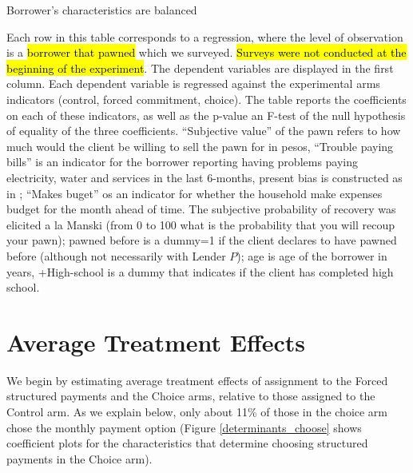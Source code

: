 \documentclass[12pt, a4paper]{article}
\begin{document}
\begin{table}[H]
\caption{Borrower's characteristics are balanced}
\label{SS_final}
\begin{center}
\resizebox{0.65\textwidth}{!}{
\footnotesize{}
}
\end{center}
\scriptsize {Each row in this table corresponds to a regression, where the level of observation is a \hl{borrower that pawned} which we surveyed.  \hl{Surveys were not conducted at the beginning of the experiment}. The dependent variables are displayed in the first column. Each dependent variable is regressed against the experimental arms indicators (control, forced commitment, choice). The table reports the coefficients on each of these indicators, as well as the p-value an F-test of the null hypothesis of equality of the three coefficients. ``Subjective value'' of the pawn refers to how much would the client be willing to sell the pawn for in pesos, ``Trouble paying bills'' is an indicator for the borrower reporting having problems paying electricity, water and services in the last 6-months, present bias is constructed as in \cite{Ashraf}; ``Makes buget'' os an indicator for whether the household make expenses budget for the month ahead of time. The subjective probability of recovery was elicited a la Manski (from 0 to 100 what is the probability that you will recoup your pawn); pawned before is a dummy=1 if the client declares to have pawned before (although not necessarily with Lender $P$); age is age of the borrower in years, +High-school is a dummy that indicates if the client has completed high school. 
}
\end{table}




\section{Average Treatment Effects} \label{Experiment}



We begin by estimating average treatment effects of assignment to the Forced structured payments and the Choice arms, relative to those assigned to the Control arm. As we explain below, only about 11\% of those in the choice arm chose the monthly payment option (Figure \ref{determinants_choose} shows coefficient plots for the characteristics that determine choosing structured payments in the Choice arm).

\end{document}
